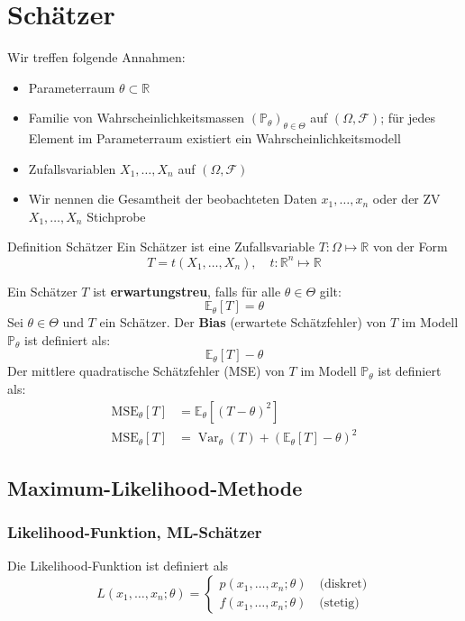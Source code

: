 \documentclass[a4paper,10pt]{article}
\def\R{\mathbb{R}}
\def\P{\mathbb{P}}
\def\F{\mathcal{F}}
\def\E{\mathbb{E}}
\DeclareMathOperator{\Var}{\text{Var}}
\begin{document}
\section{Schätzer}
Wir treffen folgende Annahmen:
\begin{itemize}
	\item Parameterraum \(\theta \subset \R\)
	\item Familie von Wahrscheinlichkeitsmassen \((\P_\theta)_{\theta \in \Theta}\) auf \((\Omega, \F)\); für jedes Element im Parameterraum existiert ein Wahrscheinlichkeitsmodell
	\item Zufallsvariablen \(X_1, \ldots, X_n\) auf \((\Omega, \F)\)
	\item Wir nennen die Gesamtheit der beobachteten Daten \(x_1, \ldots, x_n\) oder der ZV \(X_1, \ldots, X_n\) Stichprobe
\end{itemize}
\begin{mainbox}{Definition Schätzer}
	Ein Schätzer ist eine Zufallsvariable \(T: \Omega \mapsto \R\) von der Form
	\[T = t(X_1, \ldots, X_n), \quad t: \R^n \mapsto \R\]
\end{mainbox}
Ein Schätzer \(T\) ist \textbf{erwartungstreu}, falls für alle \(\theta \in \Theta\) gilt:
\[\E_\theta [T] = \theta\]
Sei \(\theta \in \Theta\) und \(T\) ein Schätzer. Der \textbf{Bias} (erwartete Schätzfehler) von \(T\) im Modell \(\P_\theta\) ist definiert als:
\[\E_\theta[T]-\theta\]
Der mittlere quadratische Schätzfehler (MSE) von \(T\) im Modell \(\P_\theta\) ist definiert als:
\begin{align*}
	\text{MSE}_\theta[T] & = \E_\theta[(T-\theta)^2]                    \\
	\text{MSE}_\theta[T] & = \Var_\theta(T) + (\E_\theta[T] - \theta)^2
\end{align*}

\subsection{Maximum-Likelihood-Methode}
\subsubsection{Likelihood-Funktion, ML-Schätzer}
Die Likelihood-Funktion ist definiert als
\[L(x_1, \ldots, x_n; \theta) = \begin{cases}
		p(x_1, \ldots, x_n; \theta) \quad \text{(diskret)} \\
		f(x_1, \ldots, x_n; \theta) \quad \text{(stetig)}
	\end{cases} \]
\end{document}
